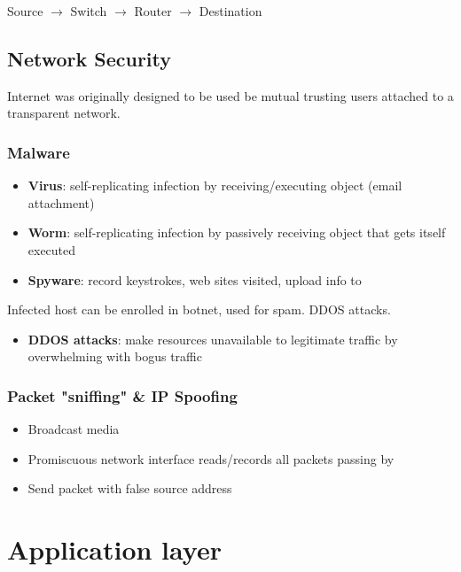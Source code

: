 \documentclass[11pt]{article}
\begin{document}
Source \(\rightarrow\)     Switch \(\rightarrow\)      Router \(\rightarrow\)     Destination 


\subsection{Network Security}
\label{sec:org4346794}

Internet was originally designed to be used be mutual trusting users
attached to a transparent network.

\subsubsection{Malware}
\label{sec:orgd957372}
\begin{itemize}
\item \textbf{Virus}: self-replicating infection by receiving/executing object
(email attachment)
\item \textbf{Worm}: self-replicating infection by passively receiving object
that gets itself executed
\item \textbf{Spyware}: record keystrokes, web sites visited, upload info to
\end{itemize}

Infected host can be enrolled in botnet, used for spam. DDOS attacks.

\begin{itemize}
\item \textbf{DDOS attacks}: make resources unavailable to legitimate traffic by
overwhelming with bogus traffic
\end{itemize}

\subsubsection{Packet "sniffing" \& IP Spoofing}
\label{sec:org78ece56}
\begin{itemize}
\item Broadcast media
\item Promiscuous network interface reads/records all packets passing by
\item Send packet with false source address
\end{itemize}




\section{Application layer}
\label{sec:orga1eef21}
\end{document}
